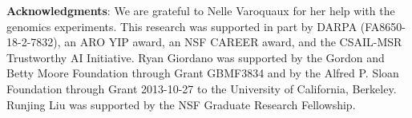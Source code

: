 
\small{
{\bf Acknowledgments}:
We are grateful to Nelle Varoquaux for her help with the genomics experiments. This research was supported in part by DARPA (FA8650-18-2-7832), an ARO
YIP award, an NSF CAREER award, and the CSAIL-MSR Trustworthy AI Initiative. Ryan Giordano was
supported by the Gordon and Betty Moore Foundation through Grant GBMF3834 and by
the Alfred P. Sloan Foundation through Grant 2013-10-27 to the University of
California, Berkeley. Runjing Liu was supported by the NSF Graduate Research
Fellowship.
}
